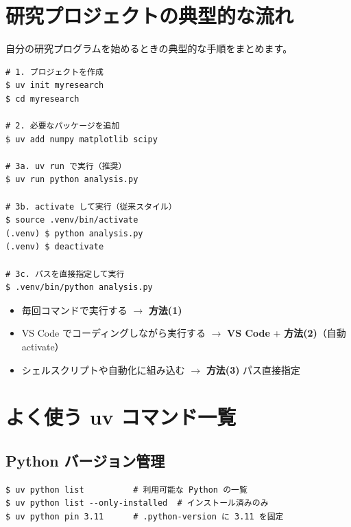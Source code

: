 \section{研究プロジェクトの典型的な流れ}

自分の研究プログラムを始めるときの典型的な手順をまとめます。

\begin{wslbox}[研究プロジェクトの開始から実行まで]
\begin{lstlisting}[style=bash]
# 1. プロジェクトを作成
$ uv init myresearch
$ cd myresearch

# 2. 必要なパッケージを追加
$ uv add numpy matplotlib scipy

# 3a. uv run で実行（推奨）
$ uv run python analysis.py

# 3b. activate して実行（従来スタイル）
$ source .venv/bin/activate
(.venv) $ python analysis.py
(.venv) $ deactivate

# 3c. パスを直接指定して実行
$ .venv/bin/python analysis.py
\end{lstlisting}
\end{wslbox}

\begin{notebox}[どれを使うか迷ったら]
\begin{itemize}
  \item 毎回コマンドで実行する $\rightarrow$ \textbf{方法(1)} 
  \item VS Code でコーディングしながら実行する $\rightarrow$ \textbf{VS Code} + \textbf{方法(2)}（自動 activate）
  \item シェルスクリプトや自動化に組み込む $\rightarrow$ \textbf{方法(3)} パス直接指定
\end{itemize}
\end{notebox}

\section{よく使う uv コマンド一覧}

\subsection{Python バージョン管理}

\begin{wslbox}
\begin{lstlisting}[style=bash]
$ uv python list          # 利用可能な Python の一覧
$ uv python list --only-installed  # インストール済みのみ
$ uv python pin 3.11      # .python-version に 3.11 を固定
\end{lstlisting}
\end{wslbox}


